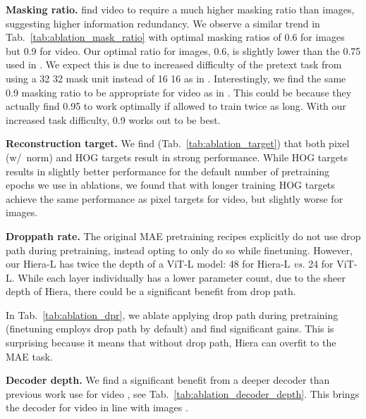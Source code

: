 \documentclass[nohyperref]{article}
\renewcommand{\paragraph}[1]{\vspace{1.25mm}\noindent\textbf{#1}}
\newcommand{\name}{{Hiera}}
\newcommand{\shortname}{{Hiera}}
\theoremstyle{plain}
\theoremstyle{definition}
\theoremstyle{remark}
\begin{document}
\paragraph{Masking ratio.}
\citet{mae-st} find video to require a much higher masking ratio than images, suggesting higher information redundancy.
We observe a similar trend in Tab.~\ref{tab:ablation_mask_ratio} with optimal masking ratios of 0.6 for images but 0.9 for video.
Our optimal ratio for images, 0.6, is slightly lower than the 0.75 used in \citet{mae}. We expect this is due to increased difficulty of the pretext task from using a 32  32 mask unit instead of 16  16 as in \citet{mae}.
Interestingly, we find the same 0.9 masking ratio to be appropriate for video as in \citet{mae-st}.
This could be because they actually find 0.95 to work optimally if allowed to train twice as long. With our increased task difficulty, 0.9 works out to be best.


\paragraph{Reconstruction target.} We find (Tab.~\ref{tab:ablation_target}) that both pixel (w\slash~norm) and HOG \cite{hog} targets result in strong performance. While HOG targets results in slightly better performance for the default number of pretraining epochs we use in ablations, we found that with longer training HOG targets achieve the same performance as pixel targets for video, but slightly worse for images.


\paragraph{Droppath rate.}
The original MAE pretraining recipes \cite{mae,mae-st} explicitly do not use drop path \cite{droppath} during pretraining, instead opting to only do so while finetuning. However, our \shortname{-L} has twice the depth of a ViT-L model: 48 for \shortname{-L} \textit{vs.} 24 for ViT-L. While each layer individually has a lower parameter count, due to the sheer depth of \shortname{}, there could be a significant benefit from drop path.

In Tab.~\ref{tab:ablation_dpr}, we ablate applying drop path during pretraining (finetuning employs drop path by default) and find significant gains. This is surprising because it means that without drop path, \name{} can overfit to the MAE task.


\paragraph{Decoder depth.}
We find a significant benefit from a deeper decoder than previous work use for video \cite{mae-st}, see Tab.~\ref{tab:ablation_decoder_depth}. This brings the decoder for video in line with images \cite{mae}.
\end{document}
